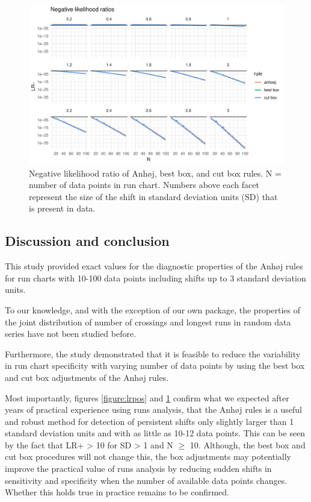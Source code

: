 \begin{figure}[htbp]
  \centering
  \includegraphics[width=\textwidth]{fig_lrneg.pdf}
  \caption{Negative likelihood ratio of Anhøj, best box, and cut box rules.
           N = number of data points in run chart.
           Numbers above each facet represent the size of the shift in standard
           deviation units (SD) that is present in data.}
  \label{figure:lrneg}
\end{figure}

\hypertarget{discussion-and-conclusion}{%
\subsection{Discussion and conclusion}\label{discussion-and-conclusion}}

This study provided exact values for the diagnostic properties of the
Anhøj rules for run charts with 10-100 data points including shifts up
to 3 standard deviation units.

To our knowledge, and with the exception of our own 
package, the properties of the joint distribution of number of crossings
and longest runs in random data series have not been studied before.

Furthermore, the study demonstrated that it is feasible to reduce the
variability in run chart specificity with varying number of data points
by using the best box and cut box adjustments of the Anhøj rules.

Most importantly, figures \ref{figure:lrpos} and \ref{figure:lrneg}
confirm what we expected after years of practical experience using runs
analysis, that the Anhøj rules is a useful and robust method for
detection of persistent shifts only slightly larger than 1 standard
deviation units and with as little as 10-12 data points. This can be
seen by the fact that LR+ \textgreater{} 10 for SD \textgreater{} 1 and
N \(\geq\) 10. Although, the best box and cut box procedures will not
change this, the box adjustments may potentially improve the practical
value of runs analysis by reducing sudden shifts in sensitivity and
specificity when the number of available data points changes. Whether
this holds true in practice remains to be confirmed.

